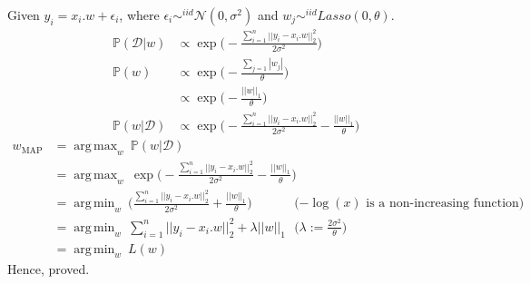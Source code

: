 \documentclass[12pt, fleqn]{article}
\DeclareMathOperator*{\argmax}{arg\,max}
\DeclareMathOperator*{\argmin}{arg\,min}
\begin{document}
\subsubsection{}
Given $y_i = x_i . w + \epsilon_i$, where $\epsilon_i \sim^{iid} \mathcal{N}(0, \sigma^2)$ and $w_j \sim^{iid} Lasso(0, \theta)$.
\begin{equation*}
  \begin{aligned}
    \mathbb{P}(\mathcal{D} | w) & \propto \exp \bigg( -\frac{\sum_{i=1}^n || y_i - x_i . w ||_2^2}{2 \sigma^2} \bigg)                         \\
    \mathbb{P}(w)               & \propto \exp \bigg( -\frac{\sum_{j=1} |w_j|}{\theta} \bigg)                                                 \\
                                & \propto \exp \bigg( -\frac{||w||_1}{\theta} \bigg)                                                          \\
    \mathbb{P}(w | \mathcal{D}) & \propto \exp \bigg( -\frac{\sum_{i=1}^n || y_i - x_i . w ||_2^2}{2 \sigma^2} -\frac{||w||_1}{\theta} \bigg)
  \end{aligned}
\end{equation*}
\begin{equation*}
  \begin{aligned}
    w_{\text{MAP}} & = \argmax_w \ \mathbb{P}(w | \mathcal{D})                                                                                                                              \\
                   & = \argmax_w \ \exp \bigg( -\frac{\sum_{i=1}^n || y_i - x_i . w ||_2^2}{2 \sigma^2} -\frac{||w||_1}{\theta} \bigg)                                                      \\
                   & = \argmin_w \ \bigg( \frac{\sum_{i=1}^n || y_i - x_i . w ||_2^2}{2 \sigma^2} + \frac{||w||_1}{\theta} \bigg)      & \text{($-\log(x)$ is a non-increasing function)}   \\
                   & = \argmin_w \ \sum_{i=1}^n || y_i - x_i . w ||_2^2 + \lambda ||w||_1                                              & \bigg( \lambda := \frac{2 \sigma^2}{\theta} \bigg) \\
                   & = \argmin_w \ L(w)
  \end{aligned}
\end{equation*}
Hence, proved.
\end{document}
